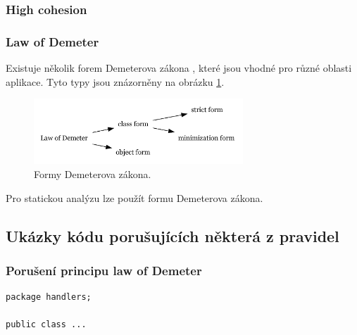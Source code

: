


\subsubsection{High cohesion}

\subsubsection{Law of Demeter}

Existuje několik forem Demeterova zákona \cite{35588}, které jsou vhodné pro různé oblasti aplikace. Tyto typy jsou znázorněny na obrázku \ref{demeter_law_types}.

\begin{figure}[h!]
\centering
\includegraphics[width=0.7\textwidth]{./graphs/demeter_law_types.png}
\caption{Formy Demeterova zákona.\label{demeter_law_types}}
\end{figure}

Pro statickou analýzu lze použít  formu Demeterova zákona.

\subsection{Ukázky kódu porušujících některá z pravidel}

\subsubsection{Porušení principu law of Demeter}

\begin{verbatim}
package handlers;

public class ...

\end{verbatim}

